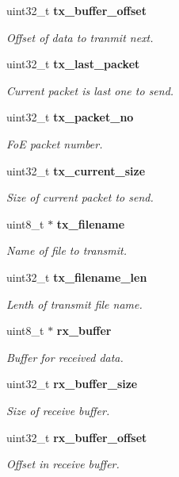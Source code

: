 \begin{DoxyCompactItemize}
uint32\-\_\-t {\bf tx\-\_\-buffer\-\_\-offset}
\begin{DoxyCompactList}\small\item\em Offset of data to tranmit next. \end{DoxyCompactList}\item 
uint32\-\_\-t {\bf tx\-\_\-last\-\_\-packet}
\begin{DoxyCompactList}\small\item\em Current packet is last one to send. \end{DoxyCompactList}\item 
uint32\-\_\-t {\bf tx\-\_\-packet\-\_\-no}
\begin{DoxyCompactList}\small\item\em Fo\-E packet number. \end{DoxyCompactList}\item 
uint32\-\_\-t {\bf tx\-\_\-current\-\_\-size}
\begin{DoxyCompactList}\small\item\em Size of current packet to send. \end{DoxyCompactList}\item 
uint8\-\_\-t $\ast$ {\bf tx\-\_\-filename}
\begin{DoxyCompactList}\small\item\em Name of file to transmit. \end{DoxyCompactList}\item 
uint32\-\_\-t {\bf tx\-\_\-filename\-\_\-len}
\begin{DoxyCompactList}\small\item\em Lenth of transmit file name. \end{DoxyCompactList}\item 
uint8\-\_\-t $\ast$ {\bf rx\-\_\-buffer}
\begin{DoxyCompactList}\small\item\em Buffer for received data. \end{DoxyCompactList}\item 
uint32\-\_\-t {\bf rx\-\_\-buffer\-\_\-size}
\begin{DoxyCompactList}\small\item\em Size of receive buffer. \end{DoxyCompactList}\item 
uint32\-\_\-t {\bf rx\-\_\-buffer\-\_\-offset}
\begin{DoxyCompactList}\small\item\em Offset in receive buffer. \end{DoxyCompactList}\item 

\end{DoxyCompactItemize}
